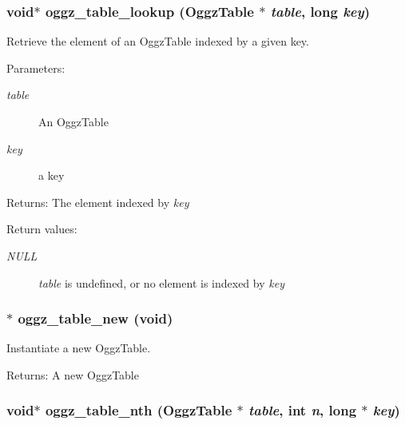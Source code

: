 \subsubsection{\setlength{\rightskip}{0pt plus 5cm}void$\ast$ oggz\_\-table\_\-lookup ({\bf Oggz\-Table} $\ast$ {\em table}, long {\em key})}\label{oggz__table_8h_a4}


Retrieve the element of an Oggz\-Table indexed by a given key. 

\begin{Desc}
\item[Parameters:]
\begin{description}
\item[{\em table}]An Oggz\-Table \item[{\em key}]a key \end{description}
\end{Desc}
\begin{Desc}
\item[Returns:]The element indexed by {\em key\/} \end{Desc}
\begin{Desc}
\item[Return values:]
\begin{description}
\item[{\em NULL}]{\em table\/} is undefined, or no element is indexed by {\em key\/} \end{description}
\end{Desc}
\subsubsection{$\ast$ oggz\_\-table\_\-new (void)}\label{oggz__table_8h_a1}


Instantiate a new Oggz\-Table. 

\begin{Desc}
\item[Returns:]A new Oggz\-Table \end{Desc}
\subsubsection{\setlength{\rightskip}{0pt plus 5cm}void$\ast$ oggz\_\-table\_\-nth ({\bf Oggz\-Table} $\ast$ {\em table}, int {\em n}, long $\ast$ {\em key})}\label{oggz__table_8h_a6}


